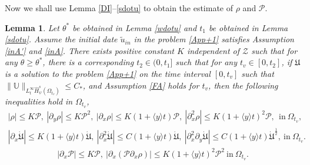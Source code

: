 \documentclass{amsart}
\numberwithin{equation}{section}
\newtheorem{lemma}{Lemma}[section]
\newcommand\y{{{\langle y \rangle}}}
\begin{document}
Now we shall use Lemma \ref{DI}--\ref{sdotu} to obtain the estimate of $\rho$ and $\mathcal{P}$.
\begin{lemma}\label{rhoP}
Let $\theta^{*}$ be obtained in Lemma \ref{wdotu} and $t_{1}$ be obtained in Lemma \ref{sdotu}.
Assume the initial date $\tilde{u}_{in}$ in the problem \eqref{App+1} satisfies Assumption \ref{inA'} and \ref{inA}.
There exists positive constant $K$ independent of $\mathcal{Z}$ such that for any $\theta\geq\theta^{*}$, there is a corresponding $t_{2}\in(0,t_{1}]$ such that for any $t_{v}\in[0,t_{2}]$, if $\mathfrak{U}$ is a solution to the problem \eqref{App+1} on the time interval $[0,t_{v}]$ such that
$\|\mathbb{U}\|_{L_{t}^{\infty}\hat{H}_{\psi}^{s}(\Omega_{t_{v}})}\leq C_{*}$,
and Assumption \ref{FA} holds for $t_{v}$, then the following inequalities hold in $\Omega_{t_{v}}$,
\begin{align}\label{rhop1}
|\rho|\leq K\mathcal{P},~
|\partial_{y}\rho|\leq K\mathcal{P}^{2},~
|\partial_{x}\rho|\leq K(1+\y t)\mathcal{P},~
|\partial_{x}^{2}\rho|\leq K(1+\y t)^{2}\mathcal{P},~
~\text{in}~\Omega_{t_{v}},
\end{align}
\begin{align}\label{rhop2}
|\partial_{x}\dot{\mathfrak{U}}|\leq K(1+\y t)\dot{\mathfrak{U}},~
|\partial_{x}^{2}\dot{\mathfrak{U}}|\leq C(1+\y t)\dot{\mathfrak{U}},~
|\partial_{x}^{2}\partial_{y}\dot{\mathfrak{U}}|\leq C(1+\y t)\dot{\mathfrak{U}}^{\frac{1}{2}},~\text{in}~\Omega_{t_{v}}.
\end{align}
\begin{align}\label{rhop3}
|\partial_{x}\mathcal{P}|\leq K\mathcal{P},~
\left|\partial_{x}(\mathcal{P}\partial_{x}\rho)\right|\leq K(1+\y t)^{2}\mathcal{P}^{2}~\text{in}~\Omega_{t_{v}}.
\end{align}
\end{lemma}
\end{document}
